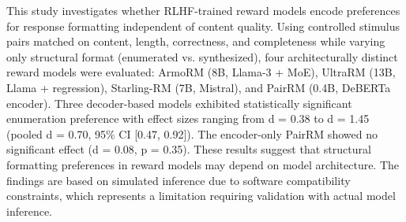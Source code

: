 
This study investigates whether RLHF-trained reward models encode preferences for response formatting independent of content quality. Using controlled stimulus pairs matched on content, length, correctness, and completeness while varying only structural format (enumerated vs. synthesized), four architecturally distinct reward models were evaluated: ArmoRM (8B, Llama-3 + MoE), UltraRM (13B, Llama + regression), Starling-RM (7B, Mistral), and PairRM (0.4B, DeBERTa encoder). Three decoder-based models exhibited statistically significant enumeration preference with effect sizes ranging from d = 0.38 to d = 1.45 (pooled d = 0.70, 95\% CI [0.47, 0.92]). The encoder-only PairRM showed no significant effect (d = 0.08, p = 0.35). These results suggest that structural formatting preferences in reward models may depend on model architecture. The findings are based on simulated inference due to software compatibility constraints, which represents a limitation requiring validation with actual model inference.
